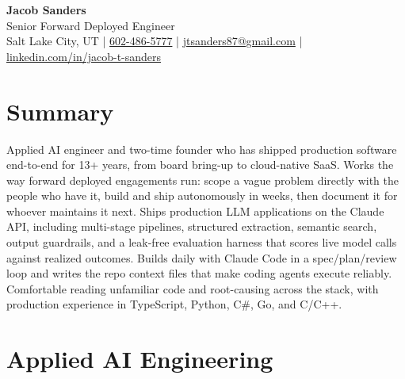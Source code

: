 \documentclass[10.5pt, letterpaper]{article}
\begin{document}
\begin{center}
  {\fontsize{28}{32}\selectfont\bfseries\color{accent} Jacob Sanders}\\[5pt]
  {\large\color{muted} Senior Forward Deployed Engineer}\\[8pt]
  \small
  \faMapMarker\enspace Salt Lake City, UT
  \enspace\textcolor{accent}{|}\enspace
  \faPhone\enspace \href{tel:6024865777}{602-486-5777}
  \enspace\textcolor{accent}{|}\enspace
  \faEnvelope\enspace \href{mailto:jtsanders87@gmail.com}{jtsanders87@gmail.com}
  \enspace\textcolor{accent}{|}\enspace
  \faLinkedin\enspace \href{https://linkedin.com/in/jacob-t-sanders}{linkedin.com/in/jacob-t-sanders}
\end{center}

\vspace{2pt}

\section{Summary}

Applied AI engineer and two-time founder who has shipped production software
end-to-end for 13+ years, from board bring-up to cloud-native SaaS. Works the way
forward deployed engagements run: scope a vague problem directly with the people
who have it, build and ship autonomously in weeks, then document it for whoever
maintains it next. Ships production LLM applications on the Claude API,
including multi-stage pipelines, structured extraction, semantic search, output
guardrails, and a leak-free evaluation harness that scores live model calls
against realized outcomes. Builds daily with Claude Code in a spec/plan/review
loop and writes the repo context files that make coding agents execute reliably.
Comfortable reading unfamiliar code and root-causing across the stack, with
production experience in TypeScript, Python, C\#, Go, and C/C++.

\section{Applied AI Engineering}
\end{document}
